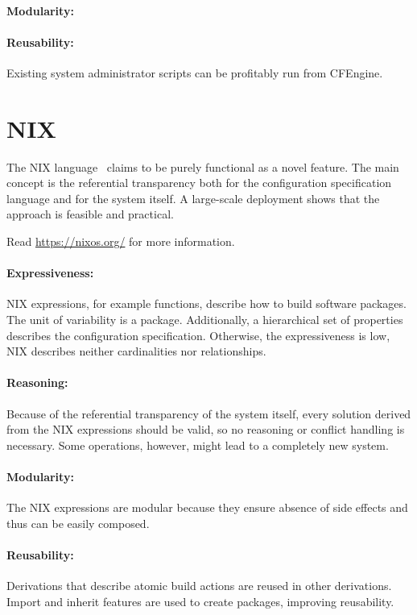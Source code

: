 \paragraph*{Modularity:}
\notsupported{}

\paragraph*{Reusability:}
Existing system administrator scripts can be profitably run from CFEngine.


\section{NIX}

The NIX language~\cite{dolstra2007purely} claims to be purely functional as a novel feature.
The main concept is the referential transparency both for the configuration specification language and for the system itself.
A large-scale deployment shows that the approach is feasible and practical.

Read \url{https://nixos.org/} for more information.

\paragraph*{Expressiveness:}
NIX expressions, for example functions, describe how to build software packages.
The unit of variability is a package.
Additionally, a hierarchical set of properties describes the configuration specification.
Otherwise, the expressiveness is low, NIX describes neither cardinalities nor relationships.

\paragraph*{Reasoning:}
Because of the referential transparency of the system itself, every solution derived from the NIX expressions should be valid, so no reasoning or conflict handling is necessary.
Some operations, however, might lead to a completely new system.

\paragraph*{Modularity:}
The NIX expressions are modular because they ensure absence of side effects and thus can be easily composed.

\paragraph*{Reusability:}
Derivations that describe atomic build actions are reused in other derivations.
Import and inherit features are used to create packages, improving reusability.




